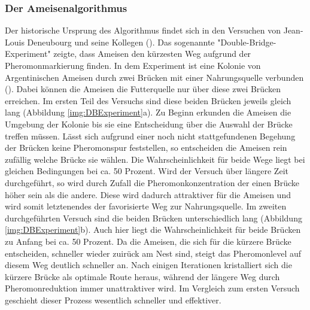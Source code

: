 \documentclass[doktyp=barbeit, sprache=german]{TUBAFarbeiten}
\begin{document}
\subsubsection{Der Ameisenalgorithmus}
Der historische Ursprung des Algorithmus findet sich in den Versuchen von Jean-Louis Deneubourg und seine Kollegen (\cite{Biological}). Das sogenannte "Double-Bridge-Experiment" zeigte, dass Ameisen den kürzesten Weg aufgrund der Pheromonmarkierung finden. In dem Experiment ist eine Kolonie von Argentinischen Ameisen durch zwei Brücken mit einer Nahrungsquelle verbunden (\cite{Dorigo2007}). Dabei können die Ameisen die Futterquelle nur über diese zwei Brücken erreichen. Im ersten Teil des Versuchs sind diese beiden Brücken jeweils gleich lang (Abbildung \ref{img:DBExperiment}a). Zu Beginn erkunden die Ameisen die Umgebung der Kolonie bis sie eine Entscheidung über die Auswahl der Brücke treffen müssen. Lässt sich aufgrund einer noch nicht stattgefundenen Begehung der Brücken keine Pheromonspur feststellen, so entscheiden die Ameisen rein zufällig welche Brücke sie wählen. Die Wahrscheinlichkeit für beide Wege liegt bei gleichen Bedingungen bei ca. 50 Prozent. Wird der Versuch über längere Zeit durchgeführt, so wird durch Zufall die Pheromonkonzentration der einen Brücke höher sein als die andere. Diese wird dadurch attraktiver für die Ameisen und wird somit letztenendes der favorisierte Weg zur Nahrungsquelle. Im zweiten durchgeführten Versuch sind die beiden Brücken unterschiedlich lang (Abbildung \ref{img:DBExperiment}b). Auch hier liegt die Wahrscheinlichkeit für beide Brücken zu Anfang bei ca. 50 Prozent. Da die Ameisen, die sich für die kürzere Brücke entscheiden, schneller wieder zuirück am Nest sind, steigt das Pheromonlevel auf diesem Weg deutlich schneller an. Nach einigen Iterationen kristalliert sich die kürzere Brücke als optimale Route heraus, während der längere Weg durch Pheromonreduktion immer unattraktiver wird. Im Vergleich zum ersten Versuch geschieht dieser Prozess wesentlich schneller und effektiver.
\end{document}
